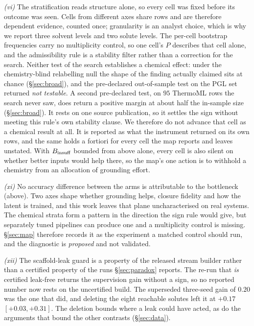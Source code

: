 \emph{(vi)} The stratification reads structure alone, so every cell was fixed before its outcome was seen.
Cells from different axes share rows and are therefore dependent evidence, counted once; granularity
is an analyst choice, which is why we report three solvent levels and two solute levels. The
per-cell bootstrap frequencies carry no multiplicity control, so one cell's $P$ describes that cell
alone, and the admissibility rule is a stability filter rather than a correction for the search.
Neither test of the search establishes a chemical effect: under the chemistry-blind relabelling null
the shape of the finding actually claimed sits at chance (\S\ref{sec:broad}), and the pre-declared
out-of-sample test on the PGL set returned \emph{not testable}. A second pre-declared test, on $95$
ThermoML rows the search never saw, does return a positive margin at about half the in-sample size
(\S\ref{sec:broad}). It rests on one source publication, so it settles the sign without meeting
this rule's own stability clause. We therefore do not advance that cell as a chemical result at all. It is reported as what the
instrument returned on its own rows, and
the same holds a fortiori for every cell the map reports and leaves unstated. With $B_{\mathrm{insuff}}$ bounded
from above alone, every cell is also silent on whether better inputs would help there, so the map's
one action is to withhold a chemistry from an allocation of grounding effort.

\emph{(xi)} No accuracy difference between the arms is attributable to the bottleneck (above). Two axes
shape whether grounding helps, closure fidelity and how the latent is trained, and this work leaves
that plane uncharacterised on real systems. The chemical strata form a pattern in
the direction the sign rule would give, but separately tuned pipelines can produce one and a
multiplicity control is missing. \S\ref{sec:map} therefore records it as the experiment a matched
control should run, and the diagnostic is \emph{proposed} and not validated.

\emph{(xii)} The scaffold-leak guard is a property of the released stream builder rather than a certified
property of the runs \S\ref{sec:paradox} reports. The re-run that \emph{is} certified leak-free
returns the supervision gain without a sign, so no reported number now rests on the uncertified
build. The superseded three-seed gain of $0.20$ was the one that did, and deleting the eight
reachable solutes left it at $+0.17$ $[+0.03,+0.31]$. The deletion bounds where a leak could have
acted, as do the arguments that bound the other contrasts (\S\ref{sec:data}).

